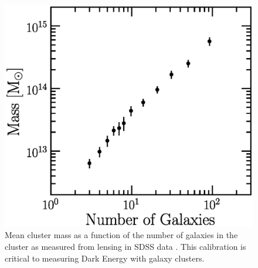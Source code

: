 \documentclass[12pt]{article}
\begin{document}
\begin{figure}[p]
\centering
\includegraphics[scale=0.7]{mass-rich-plot.eps}
\caption{Mean cluster mass as a function of the number of
galaxies in the cluster as measured from lensing in SDSS
data \cite{SheldonLensing07,JohnstonLensing07}. This calibration
is critical to measuring Dark Energy with galaxy clusters.\label{fig:massngals}}
\end{figure}
\end{document}
